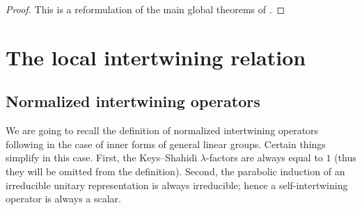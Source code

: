 \documentclass[11pt,reqno]{amsart}
\theoremstyle{plain}
\theoremstyle{definition}
\numberwithin{equation}{subsection}
\begin{document}
\begin{proof}
This is a reformulation of the main global theorems of \cite{Bad,BadRen}.
\end{proof}

\section{The local intertwining relation}\label{s:LIR-statement}

\subsection{Normalized intertwining operators}\label{ss:normalized-intertwining-operators}

We are going to recall the definition of normalized intertwining operators following \cite{Arthur,KMSW} in the case of inner forms of general linear groups. Certain things simplify in this case. First, the Keys--Shahidi $\lambda$-factors are always equal to $1$ (thus they will be omitted from the definition). Second, the parabolic induction of an irreducible unitary representation is always irreducible; hence a self-intertwining operator is always a scalar.
\end{document}

